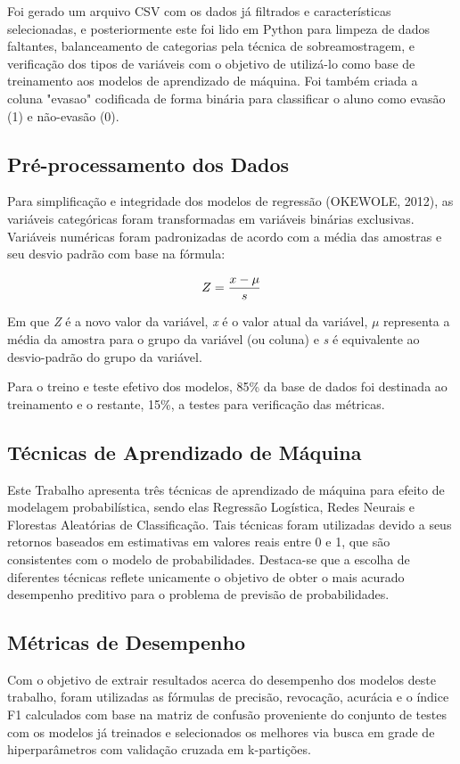 \documentclass[english, spanish, brazilian]{RBIEarticle} %
\begin{document}
Foi gerado um arquivo CSV com os dados já filtrados e características selecionadas, e posteriormente este foi lido em Python para limpeza de dados faltantes, balanceamento de categorias pela técnica de sobreamostragem, e verificação dos tipos de variáveis com o objetivo de utilizá-lo como base de treinamento aos modelos de aprendizado de máquina. Foi também criada a coluna "evasao" codificada de forma binária para classificar o aluno como evasão (1) e não-evasão (0).


\subsection{Pré-processamento dos Dados}
Para simplificação e integridade dos modelos de regressão (OKEWOLE, 2012), as variáveis categóricas foram transformadas em variáveis binárias exclusivas. Variáveis numéricas foram padronizadas de acordo com a média das amostras e seu desvio padrão com base na fórmula:

\vspace{0.5cm}
\begin{equation}
\large Z = \frac{x-\mu}{s}
\end{equation}
\vspace{0.5cm}

Em que \textit{Z} é a novo valor da variável, \textit{x} é o valor atual da variável, $\mu$ representa a média da amostra para o grupo da variável (ou coluna) e \textit{s} é equivalente ao desvio-padrão do grupo da variável.

Para o treino e teste efetivo dos modelos, 85\% da base de dados foi destinada ao treinamento e o restante, 15\%, a testes para verificação das métricas. 

\subsection{Técnicas de Aprendizado de Máquina}
Este Trabalho apresenta três técnicas de aprendizado de máquina para efeito de modelagem probabilística, sendo elas Regressão Logística, Redes Neurais e Florestas Aleatórias de Classificação. Tais técnicas foram utilizadas devido a seus retornos baseados em estimativas em valores reais entre 0 e 1, que são consistentes com o modelo de probabilidades. Destaca-se que a escolha de diferentes técnicas reflete unicamente o objetivo de obter o mais acurado desempenho preditivo para o problema de previsão de probabilidades.

\subsection{Métricas de Desempenho}
Com o objetivo de extrair resultados acerca do desempenho dos modelos deste trabalho, foram utilizadas as fórmulas de precisão, revocação, acurácia e o índice F1 calculados com base na matriz de confusão proveniente do conjunto de testes com os modelos já treinados e selecionados os melhores via busca em grade de hiperparâmetros com validação cruzada em k-partições.
\end{document}
